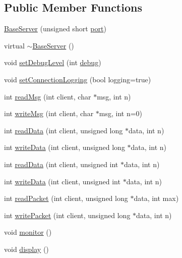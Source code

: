 \subsection*{Public Member Functions}
\begin{DoxyCompactItemize}
\item 
\hyperlink{classBaseServer_a04931ee29456204b3ef3eb8f7d496f3b}{Base\-Server} (unsigned short \hyperlink{classBaseServer_a66052c095234e31cada29b678b039c68}{port})
\item 
virtual \hyperlink{classBaseServer_af26a04f6b9e4a614157bf92b69765979}{$\sim$\-Base\-Server} ()
\item 
void \hyperlink{classBaseServer_aa62de94b6fdf829df0cffe05db5f6120}{set\-Debug\-Level} (int \hyperlink{classBaseServer_a078ea2911e24a247cfec950e13bb78dc}{debug})
\item 
void \hyperlink{classBaseServer_a8718ce2924a44417b363901df8c23eb3}{set\-Connection\-Logging} (bool logging=true)
\item 
int \hyperlink{classBaseServer_afde0942ae323e3a4b3e748d227b24c55}{read\-Msg} (int client, char $\ast$msg, int n)
\item 
int \hyperlink{classBaseServer_a1841f7210f1e7083320d2c5c43a238d1}{write\-Msg} (int client, char $\ast$msg, int n=0)
\item 
int \hyperlink{classBaseServer_afdbd104f5be856c7c58426cacfeda1d1}{read\-Data} (int client, unsigned long $\ast$data, int n)
\item 
int \hyperlink{classBaseServer_adf88b5234a4f4d8b628532d8c6414411}{write\-Data} (int client, unsigned long $\ast$data, int n)
\item 
int \hyperlink{classBaseServer_aa0d062a605ff448863f34289da258cfd}{read\-Data} (int client, unsigned int $\ast$data, int n)
\item 
int \hyperlink{classBaseServer_a8273745a09b80f9ab45dabdef43b783d}{write\-Data} (int client, unsigned int $\ast$data, int n)
\item 
int \hyperlink{classBaseServer_aa904ae62925129a82c11845ddda25aa2}{read\-Packet} (int client, unsigned long $\ast$data, int max)
\item 
int \hyperlink{classBaseServer_a93e4a6401e0b0937116feb9af915f2b0}{write\-Packet} (int client, unsigned long $\ast$data, int n)
\item 
void \hyperlink{classBaseServer_ac4ca7f212bdcba0d1fe485bc74f3010b}{monitor} ()
\item 
void \hyperlink{classBaseServer_aef1fa86f254fcb22d1c70541f32adca1}{display} ()
\item 

\end{DoxyCompactItemize}
